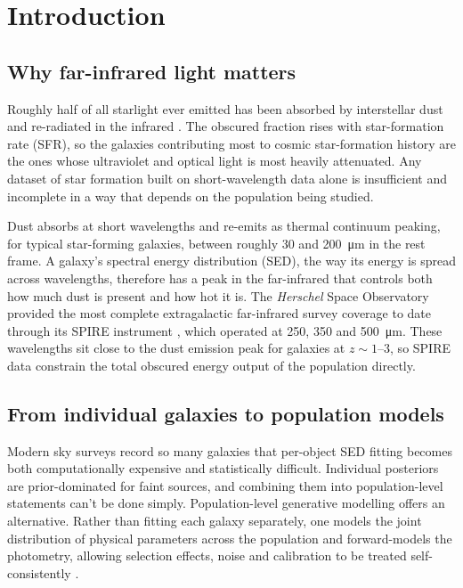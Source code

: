 \documentclass[12pt,a4paper]{article}
\begin{document}
\section{Introduction}
\label{sec:intro}

\subsection{Why far-infrared light matters}
\label{sec:intro:fir}

Roughly half of all starlight ever emitted has been absorbed by interstellar dust and
re-radiated in the infrared \citep{Dole_2006}. The
obscured fraction rises with star-formation rate (SFR), so the galaxies
contributing most to cosmic star-formation history are the ones whose ultraviolet and
optical light is most heavily attenuated. Any dataset of star formation built on
short-wavelength data alone is insufficient and incomplete in a way that depends on the
population being studied.

Dust absorbs at short wavelengths and re-emits as thermal continuum peaking, for
typical star-forming galaxies, between roughly 30 and \SI{200}{\um} in the rest frame.
A galaxy's spectral energy distribution (SED), the way its energy is spread across
wavelengths, therefore has a peak in the far-infrared that controls both how much dust
is present and how hot it is. The
\emph{Herschel} Space Observatory \citep{Pilbratt_2010} provided the most complete
extragalactic far-infrared survey coverage to date through its SPIRE instrument
\citep{Griffin_2010}, which operated at 250, 350 and \SI{500}{\um}. These
wavelengths sit close to the dust emission peak for galaxies at $z \sim 1$--$3$, so
SPIRE data constrain the total obscured energy output of the population directly.

\subsection{From individual galaxies to population models}
\label{sec:intro:population}

Modern sky surveys record so many galaxies that per-object SED fitting becomes both
computationally expensive and statistically difficult. Individual posteriors are
prior-dominated for faint sources, and combining them into population-level statements
can't be done simply. Population-level generative modelling offers an alternative. Rather than
fitting each galaxy separately, one models the joint distribution of physical parameters
across the population and forward-models the photometry, allowing selection effects,
noise and calibration to be treated self-consistently \citep{Alsing_2024}.
\end{document}
